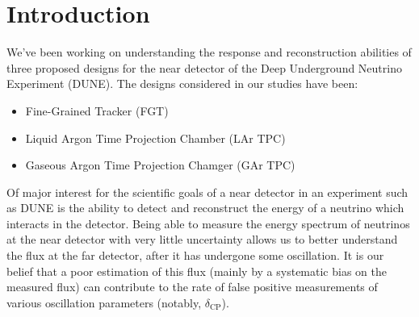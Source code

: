 \documentclass{article}
\begin{document}
%
%
%

\section{Introduction}

We've been working on understanding the response and reconstruction abilities of three proposed designs for the near detector of the Deep Underground Neutrino Experiment (DUNE).  The designs considered in our studies have been:

\begin{itemize}
\item Fine-Grained Tracker (FGT)
\item Liquid Argon Time Projection Chamber (LAr TPC)
\item Gaseous Argon Time Projection Chamger (GAr TPC)
\end{itemize}

Of major interest for the scientific goals of a near detector in an experiment such as DUNE is the ability to detect and reconstruct the energy of a neutrino which interacts in the detector.  Being able to measure the energy spectrum of neutrinos at the near detector with very little uncertainty allows us to better understand the flux at the far detector, after it has undergone some oscillation.  It is our belief that a poor estimation of this flux (mainly by a systematic bias on the measured flux) can contribute to the rate of false positive measurements of various oscillation parameters (notably, $\delta_{\mathrm{CP}}$).
\end{document}
